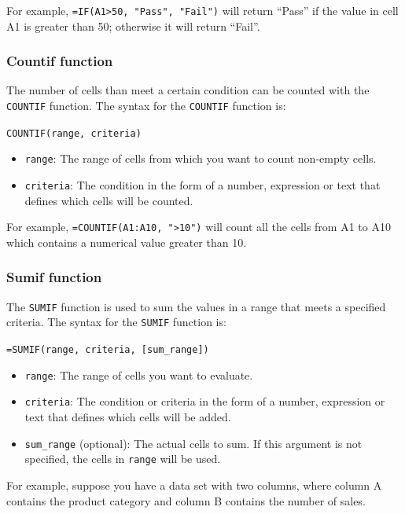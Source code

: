 \documentclass[
]{book}
\begin{document}
For example, \texttt{=IF(A1\textgreater{}50,\ "Pass",\ "Fail")} will return ``Pass'' if the value in cell A1 is greater than 50; otherwise it will return ``Fail''.

\subsubsection*{Countif function}\label{countif-function}

The number of cells than meet a certain condition can be counted with the \texttt{COUNTIF} function. The syntax for the \texttt{COUNTIF} function is:

\texttt{COUNTIF(range,\ criteria)}

\begin{itemize}
\item
  \texttt{range}: The range of cells from which you want to count non-empty cells.
\item
  \texttt{criteria}: The condition in the form of a number, expression or text that defines which cells will be counted.
\end{itemize}

For example, \texttt{=COUNTIF(A1:A10,\ "\textgreater{}10")} will count all the cells from A1 to A10 which contains a numerical value greater than 10.

\subsubsection*{Sumif function}\label{sumif-function}

The \texttt{SUMIF} function is used to sum the values in a range that meets a specified criteria. The syntax for the \texttt{SUMIF} function is:

\texttt{=SUMIF(range,\ criteria,\ {[}sum\_range{]})}

\begin{itemize}
\item
  \texttt{range}: The range of cells you want to evaluate.
\item
  \texttt{criteria}: The condition or criteria in the form of a number, expression or text that defines which cells will be added.
\item
  \texttt{sum\_range} (optional): The actual cells to sum. If this argument is not specified, the cells in \texttt{range} will be used.
\end{itemize}

For example, suppose you have a data set with two columns, where column A contains the product category and column B contains the number of sales.
\end{document}
